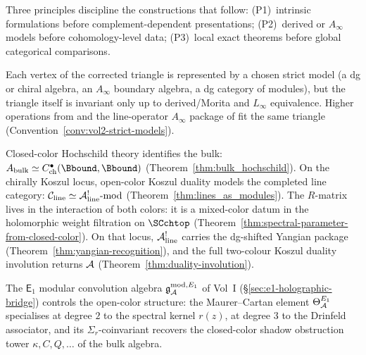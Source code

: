 Three principles discipline the constructions that follow:
(P1)~intrinsic formulations before complement-dependent
presentations; (P2)~derived or $A_\infty$ models before
cohomology-level data; (P3)~local exact theorems before global
categorical comparisons.

\begin{remark}
\label{rem:bbl-e1-primacy}
\label{rem:triangle-homotopy-first}
Each vertex of the corrected triangle is represented by a chosen
strict model (a dg or chiral algebra, an $A_\infty$ boundary
algebra, a dg category of modules), but the triangle itself is
invariant only up to derived/Morita and $L_\infty$ equivalence.
Higher operations from \cite{GKW24} and the line-operator
$A_\infty$ package of \cite{DNP25} fit the same triangle
(Convention~\ref{conv:vol2-strict-models}).
\end{remark}

\begin{remark}
\label{rem:triangle-two-colors}
Closed-color Hochschild theory identifies the bulk:
$A_{\mathrm{bulk}} \simeq C^\bullet_{\mathrm{ch}}(\Bbound,\Bbound)$
(Theorem~\ref{thm:bulk_hochschild}).
On the chirally Koszul locus, open-color Koszul duality models the
completed line category:
$\mathcal{C}_{\mathrm{line}} \simeq
\mathcal{A}^!_{\mathrm{line}}\text{-mod}$
(Theorem~\ref{thm:lines_as_modules}).
The $R$-matrix lives in the interaction of both colors: it is a
mixed-color datum in the holomorphic weight filtration on $\SCchtop$
(Theorem~\ref{thm:spectral-parameter-from-closed-color}).
On that locus, $\mathcal{A}^!_{\mathrm{line}}$ carries the dg-shifted
Yangian package (Theorem~\ref{thm:yangian-recognition}), and the full
two-colour Koszul duality involution returns $\mathcal{A}$
(Theorem~\ref{thm:duality-involution}).

The $\mathsf{E}_1$ modular convolution algebra
$\mathfrak{g}_{\mathcal{A}}^{\mathrm{mod},E_1}$
of Vol~I (\S\ref{sec:e1-holographic-bridge}) controls the
open-color structure: the Maurer--Cartan element
$\Theta_{\mathcal{A}}^{E_1}$ specialises at degree $2$ to the spectral
kernel $r(z)$, at degree $3$ to the Drinfeld associator, and its
$\Sigma_r$-coinvariant recovers the closed-color shadow obstruction
tower $\kappa, C, Q, \ldots$ of the bulk algebra.
\end{remark}

